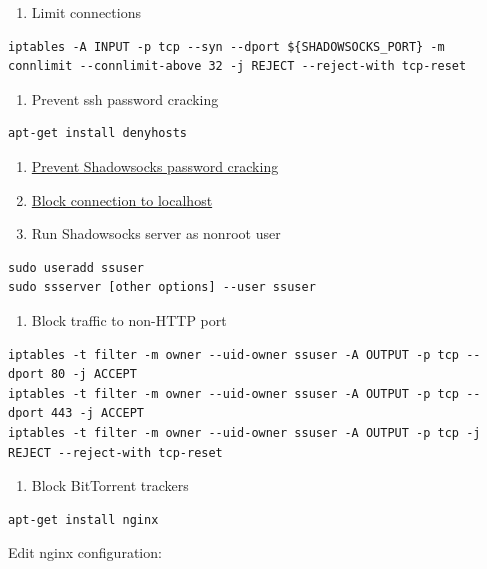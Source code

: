 \documentclass[11pt,a4paper]{sphinxmanual}
\begin{document}
\begin{enumerate}
\item Limit connections
\end{enumerate}
\begin{Verbatim}
iptables -A INPUT -p tcp --syn --dport ${SHADOWSOCKS_PORT} -m connlimit --connlimit-above 32 -j REJECT --reject-with tcp-reset
\end{Verbatim}

\begin{enumerate}
\item Prevent ssh password cracking
\end{enumerate}
\begin{Verbatim}
apt-get install denyhosts
\end{Verbatim}

\begin{enumerate}
\item \hyperref[sec:ban_brute_force_crackers]{Prevent Shadowsocks password cracking}

\item \hyperref[sec:block_connection_to_localhost]{Block connection to localhost}

\item Run Shadowsocks server as nonroot user
\end{enumerate}
\begin{Verbatim}
sudo useradd ssuser
sudo ssserver [other options] --user ssuser
\end{Verbatim}

\begin{enumerate}
\item Block traffic to non-HTTP port
\end{enumerate}
\begin{Verbatim}
iptables -t filter -m owner --uid-owner ssuser -A OUTPUT -p tcp --dport 80 -j ACCEPT
iptables -t filter -m owner --uid-owner ssuser -A OUTPUT -p tcp --dport 443 -j ACCEPT
iptables -t filter -m owner --uid-owner ssuser -A OUTPUT -p tcp -j REJECT --reject-with tcp-reset
\end{Verbatim}

\begin{enumerate}
\item Block BitTorrent trackers
\end{enumerate}
\begin{Verbatim}
apt-get install nginx
\end{Verbatim}

Edit nginx configuration:
\end{document}

